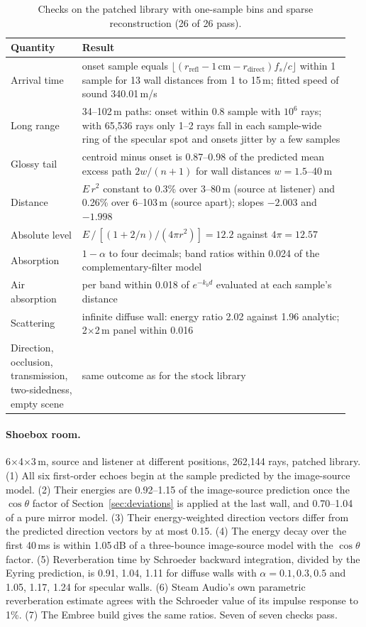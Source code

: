 \begin{table}[h]
\caption{Checks on the patched library with one-sample bins and sparse reconstruction (26 of 26 pass).}
\label{tab:val-patched}
\centering\small
\begin{tabular}{p{0.2\linewidth}p{0.75\linewidth}}
\toprule
Quantity & Result \\
\midrule
Arrival time & onset sample equals $\lfloor (r_\text{refl}-1\,\text{cm}-r_\text{direct})f_s/c\rfloor$ within 1 sample for 13 wall distances from 1 to 15\,m; fitted speed of sound 340.01\,m/s \\
Long range & 34--102\,m paths: onset within 0.8 sample with $10^6$ rays; with 65{,}536 rays only 1--2 rays fall in each sample-wide ring of the specular spot and onsets jitter by a few samples \\
Glossy tail & centroid minus onset is 0.87--0.98 of the predicted mean excess path $2w/(n+1)$ for wall distances $w=1.5$--40\,m \\
Distance & $E\,r^2$ constant to 0.3\% over 3--80\,m (source at listener) and 0.26\% over 6--103\,m (source apart); slopes $-2.003$ and $-1.998$ \\
Absolute level & $E\,/\,[(1+2/n)/(4\pi r^2)]=12.2$ against $4\pi=12.57$ \\
Absorption & $1-\alpha$ to four decimals; band ratios within 0.024 of the complementary-filter model \\
Air absorption & per band within 0.018 of $e^{-k_b d}$ evaluated at each sample's distance \\
Scattering & infinite diffuse wall: energy ratio 2.02 against 1.96 analytic; 2$\times$2\,m panel within 0.016 \\
Direction, occlusion, transmission, two-sidedness, empty scene & same outcome as for the stock library \\
\bottomrule
\end{tabular}
\end{table}

\paragraph{Shoebox room.} 6$\times$4$\times$3\,m, source and listener at different positions, 262{,}144 rays, patched library. (1) All six first-order echoes begin at the sample predicted by the image-source model. (2) Their energies are 0.92--1.15 of the image-source prediction once the $\cos\theta$ factor of Section~\ref{sec:deviations} is applied at the last wall, and 0.70--1.04 of a pure mirror model. (3) Their energy-weighted direction vectors differ from the predicted direction vectors by at most 0.15. (4) The energy decay over the first 40\,ms is within 1.05\,dB of a three-bounce image-source model with the $\cos\theta$ factor. (5) Reverberation time by Schroeder backward integration, divided by the Eyring prediction, is 0.91, 1.04, 1.11 for diffuse walls with $\alpha=0.1,0.3,0.5$ and 1.05, 1.17, 1.24 for specular walls. (6) Steam Audio's own parametric reverberation estimate agrees with the Schroeder value of its impulse response to 1\%. (7) The Embree build gives the same ratios. Seven of seven checks pass.

